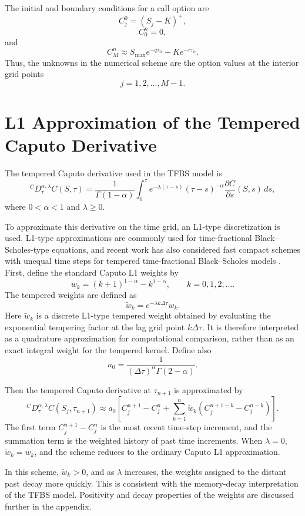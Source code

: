 \documentclass[11pt,a4paper]{report}
\begin{document}
The initial and boundary conditions for a call option are
\[
C_j^0=(S_j-K)^+,
\]
\[
C_0^n=0,
\]
and
\[
C_M^n
\approx
S_{\max}e^{-q\tau_n}
-
Ke^{-r\tau_n}.
\]
Thus, the unknowns in the numerical scheme are the option values at the interior grid points
\[
j=1,2,\dots,M-1.
\]

\section{L1 Approximation of the Tempered Caputo Derivative}

The tempered Caputo derivative used in the TFBS model is
\[
{}^C D_\tau^{\alpha,\lambda} C(S,\tau)
=
\frac{1}{\Gamma(1-\alpha)}
\int_0^\tau
e^{-\lambda(\tau-s)}
(\tau-s)^{-\alpha}
\frac{\partial C}{\partial s}(S,s)\,ds,
\]
where $0<\alpha<1$ and $\lambda\ge0$.

To approximate this derivative on the time grid, an L1-type discretization is used. L1-type approximations are commonly used for time-fractional Black--Scholes-type equations, and recent work has also considered fast compact schemes with unequal time steps for tempered time-fractional Black--Scholes models \cite{ZhouGuZhaoLi2024}. First, define the standard Caputo L1 weights by
\[
w_k
=
(k+1)^{1-\alpha}-k^{1-\alpha},
\qquad k=0,1,2,\dots.
\]
The tempered weights are defined as
\[
\widetilde w_k
=
e^{-\lambda k\Delta\tau}w_k.
\]
Here $\widetilde w_k$ is a discrete L1-type tempered weight obtained by evaluating the exponential tempering factor at the lag grid point $k\Delta\tau$. It is therefore interpreted as a quadrature approximation for computational comparison, rather than as an exact integral weight for the tempered kernel. Define also
\[
a_0
=
\frac{1}{(\Delta\tau)^\alpha\Gamma(2-\alpha)}.
\]

Then the tempered Caputo derivative at $\tau_{n+1}$ is approximated by
\[
{}^C D_\tau^{\alpha,\lambda} C(S_j,\tau_{n+1})
\approx
a_0
\left[
C_j^{n+1}-C_j^n
+
\sum_{k=1}^{n}
\widetilde w_k
\left(
C_j^{n+1-k}-C_j^{n-k}
\right)
\right].
\]
The first term $C_j^{n+1}-C_j^n$ is the most recent time-step increment, and the summation term is the weighted history of past time increments. When $\lambda=0$, $\widetilde w_k=w_k$, and the scheme reduces to the ordinary Caputo L1 approximation.

In this scheme, $\widetilde w_k>0$, and as $\lambda$ increases, the weights assigned to the distant past decay more quickly. This is consistent with the memory-decay interpretation of the TFBS model. Positivity and decay properties of the weights are discussed further in the appendix.
\end{document}
